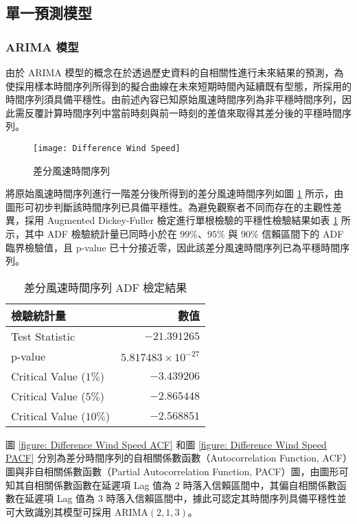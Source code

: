 \subsection{單一預測模型}

\subsubsection{ARIMA 模型}

由於 ARIMA 模型的概念在於透過歷史資料的自相關性進行未來結果的預測，為使採用樣本時間序列所得到的擬合曲線在未來短期時間內延續既有型態，所採用的時間序列須具備平穩性。由前述內容已知原始風速時間序列為非平穩時間序列，因此需反覆計算時間序列中當前時刻與前一時刻的差值來取得其差分後的平穩時間序列。

\begin{figure}[htbp]
  \centering
  \texttt{[image: Difference Wind Speed]}
  \caption{差分風速時間序列}
  \label{figure: Difference Wind Speed}
\end{figure}

將原始風速時間序列進行一階差分後所得到的差分風速時間序列如圖 \ref{figure: Difference Wind Speed} 所示，由圖形可初步判斷該時間序列已具備平穩性。為避免觀察者不同而存在的主觀性差異，採用 Augmented Dickey-Fuller 檢定進行單根檢驗的平穩性檢驗結果如表 \ref{table: Difference Time Series ADF Result} 所示，其中 ADF 檢驗統計量已同時小於在 $99\%$、$95\%$ 與 $90\%$ 信賴區間下的 ADF 臨界檢驗值，且 p-value 已十分接近零，因此該差分風速時間序列已為平穩時間序列。

\begin{table}[htbp]
  \centering
  \caption[差分風速時間序列 ADF 檢定結果]{差分風速時間序列 ADF 檢定結果}
  \begin{tabular}{lr}
    \toprule
    \textbf{檢驗統計量} & \textbf{數值}     \\
    \midrule
    Test Statistic          & $-21.391265$  \\
    p-value                 & $5.817483 \times 10^{-27}$    \\
    Critical Value ($1\%$)  & $-3.439206$   \\
    Critical Value ($5\%$)  & $-2.865448$   \\
    Critical Value ($10\%$) & $-2.568851$   \\
    \bottomrule
  \end{tabular}
  \label{table: Difference Time Series ADF Result}
\end{table}

圖 \ref{figure: Difference Wind Speed ACF}  和圖 \ref{figure: Difference Wind Speed PACF} 分別為差分時間序列的自相關係數函數（Autocorrelation Function, ACF）圖與非自相關係數函數（Partial Autocorrelation Function, PACF）圖，由圖形可知其自相關係數函數在延遲項 Lag 值為 $2$ 時落入信賴區間中，其偏自相關係數函數在延遲項 Lag 值為 $3$ 時落入信賴區間中，據此可認定其時間序列具備平穩性並可大致識別其模型可採用 $\text{ARIMA} (2, 1, 3)$。

